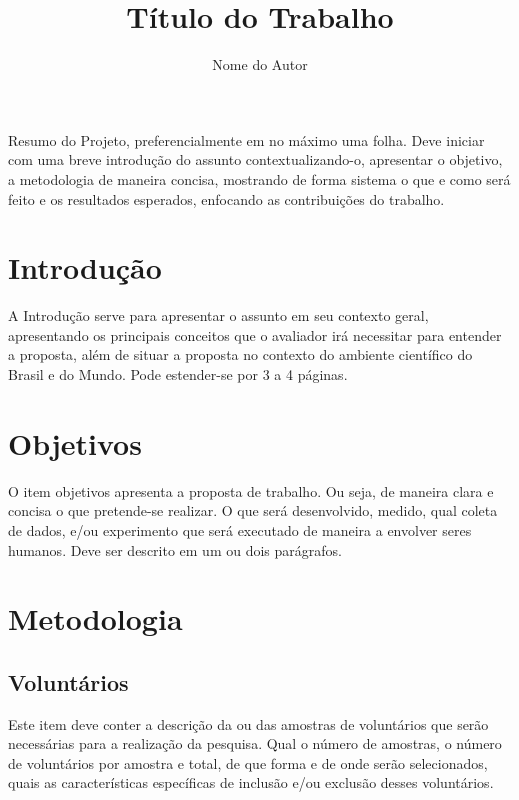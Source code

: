 \documentclass[rascunho,xindy]{Classe-Latex-FEI/fei}
\author{Nome do Autor}
\title{Título do Trabalho}
\begin{document}
\maketitle


\begin{resumo}
Resumo do Projeto, preferencialmente em no máximo uma folha. Deve iniciar com uma breve introdução do assunto contextualizando-o, apresentar o objetivo, a metodologia de maneira concisa, mostrando de forma sistema o que e como será feito e os resultados esperados, enfocando as contribuições do trabalho.
\end{resumo}


\listoffigures
\listoftables
\tableofcontents

\chapter{Introdução}

A Introdução serve para apresentar o assunto em seu contexto geral, apresentando os principais conceitos que o avaliador irá necessitar para entender a proposta, além de situar a proposta no contexto do ambiente científico do Brasil e do Mundo. Pode estender-se por 3 a 4 páginas.

\chapter{Objetivos}

O item objetivos apresenta a proposta de trabalho. Ou seja, de maneira clara e concisa o que pretende-se realizar. O que será desenvolvido, medido, qual coleta de dados, e/ou experimento que será executado de maneira a envolver seres humanos. Deve ser descrito em um ou dois parágrafos.

\chapter{Metodologia}

\section{Voluntários}

Este item deve conter a descrição da ou das amostras de voluntários que serão necessárias para a realização da pesquisa. Qual o número de amostras, o número de voluntários por amostra e total, de que forma e de onde serão selecionados, quais as características específicas de inclusão e/ou exclusão desses voluntários.
\end{document}
